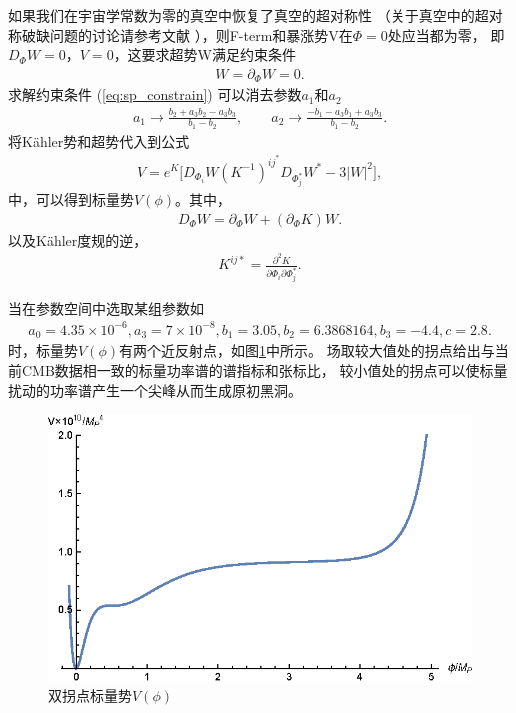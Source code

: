 如果我们在宇宙学常数为零的真空中恢复了真空的超对称性
（关于真空中的超对称破缺问题的讨论请参考文献
\citep{gao2015inflection}），则F-term和暴涨势V在$\Phi=0$处应当都为零，
即$D_{\Phi}W=0$，$V=0$，这要求超势W满足约束条件
\begin{align}\label{eq:sp_constrain}
    W=\partial_{\Phi}W=0.
\end{align}
求解约束条件 (\ref{eq:sp_constrain}) 可以消去参数$a_1$和$a_2$
\begin{align}
    a_1\rightarrow \frac{b_2+a_3b_2-a_3b_3}{b_1-b_2},\qquad 
    a_2\rightarrow \frac{-b_1-a_3b_1+a_3b_3}{b_1-b_2}.
\end{align}
将K\"ahler势和超势代入到公式
\begin{align}
    V=e^{K}\lbrack
    D_{\Phi_i}W{(K^{-1})}^{ij^{*}}D_{\Phi^{*}_j}W^{*} - 3|W|^2\rbrack,
\end{align}
中，可以得到标量势$V(\phi)$。其中，
\begin{align}
    D_{\Phi}W=\partial_{\Phi}W + {(\partial_{\Phi}K)}W.
\end{align}
以及K\"ahler度规的逆，
\begin{align}
    K^{ij*} = \frac{\partial^2K}{\partial\Phi_i\partial\Phi^{*}_j}.
\end{align}

当在参数空间中选取某组参数如
\begin{align}\label{eq:parameters}
    a_0 = 4.35\times 10^{-6},
    a_3 = 7\times 10^{-8},
    b_1 = 3.05,
    b_2 = 6.3868164,
    b_3 = -4.4,
    c = 2.8.
\end{align}
时，标量势$V(\phi)$有两个近反射点，如图\ref{fig:potential}中所示。
场取较大值处的拐点给出与当前CMB数据相一致的标量功率谱的谱指标和张标比，
较小值处的拐点可以使标量扰动的功率谱产生一个尖峰从而生成原初黑洞。
\begin{figure}[!htbp]
    \centering
    \includegraphics[width=5in]{Img/potential.eps}
    \caption{双拐点标量势$V(\phi)$}\label{fig:potential}
\end{figure}


